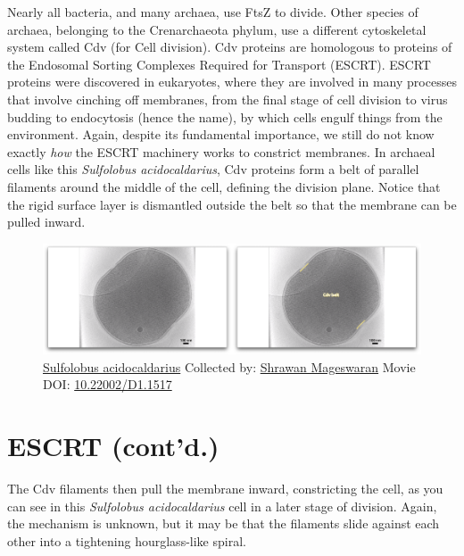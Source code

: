 \documentclass[]{tufte-book}
\begin{document}
Nearly all bacteria, and many archaea, use FtsZ to divide. Other species
of archaea, belonging to the Crenarchaeota phylum, use a different
cytoskeletal system called Cdv (for Cell division). Cdv proteins are
homologous to proteins of the Endosomal Sorting Complexes Required for
Transport (ESCRT). ESCRT proteins were discovered in eukaryotes, where
they are involved in many processes that involve cinching off membranes,
from the final stage of cell division to virus budding to endocytosis
(hence the name), by which cells engulf things from the environment.
Again, despite its fundamental importance, we still do not know exactly
\emph{how} the ESCRT machinery works to constrict membranes. In archaeal
cells like this \emph{Sulfolobus acidocaldarius}, Cdv proteins form a
belt of parallel filaments around the middle of the cell, defining the
division plane. Notice that the rigid surface layer is dismantled
outside the belt so that the membrane can be pulled inward.





\begin{figure}
\includegraphics{movie_stills/5_11} \caption[\protect\hyperlink{tree}{Sulfolobus acidocaldarius} Collected
by: \protect\hyperlink{shrawan_mageswaran}{Shrawan Mageswaran} Movie
DOI: \href{https://doi.org/10.22002/D1.1517}{10.22002/D1.1517}]{\protect\hyperlink{tree}{Sulfolobus acidocaldarius} Collected
by: \protect\hyperlink{shrawan_mageswaran}{Shrawan Mageswaran} Movie
DOI: \href{https://doi.org/10.22002/D1.1517}{10.22002/D1.1517}}\label{fig:5-11}
\end{figure}

\section{ESCRT (cont'd.)}\label{escrt-contd.}

The Cdv filaments then pull the membrane inward, constricting the cell,
as you can see in this \emph{Sulfolobus acidocaldarius} cell in a later
stage of division. Again, the mechanism is unknown, but it may be that
the filaments slide against each other into a tightening hourglass-like
spiral.
\end{document}
